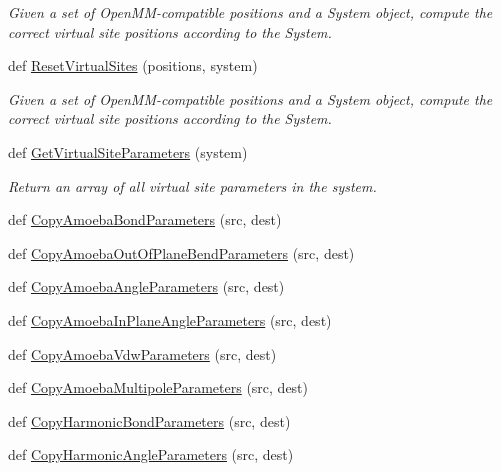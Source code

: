 \begin{DoxyCompactItemize}
\begin{DoxyCompactList}\small\item\em Given a set of Open\+M\+M-\/compatible positions and a System object, compute the correct virtual site positions according to the System. \end{DoxyCompactList}\item 
def \hyperlink{namespacesrc_1_1openmmio_ac0f168dd1caad3c5fe49e598758095c1}{Reset\+Virtual\+Sites} (positions, system)
\begin{DoxyCompactList}\small\item\em Given a set of Open\+M\+M-\/compatible positions and a System object, compute the correct virtual site positions according to the System. \end{DoxyCompactList}\item 
def \hyperlink{namespacesrc_1_1openmmio_a33ffd85523d8820df033185c58938001}{Get\+Virtual\+Site\+Parameters} (system)
\begin{DoxyCompactList}\small\item\em Return an array of all virtual site parameters in the system. \end{DoxyCompactList}\item 
def \hyperlink{namespacesrc_1_1openmmio_ac0fe2d35bcfdc2c94cda354a5bc93a11}{Copy\+Amoeba\+Bond\+Parameters} (src, dest)
\item 
def \hyperlink{namespacesrc_1_1openmmio_a72f8a12fe66bfcf92c034363652249d7}{Copy\+Amoeba\+Out\+Of\+Plane\+Bend\+Parameters} (src, dest)
\item 
def \hyperlink{namespacesrc_1_1openmmio_a9dc2514058421b3874712cfa3a745467}{Copy\+Amoeba\+Angle\+Parameters} (src, dest)
\item 
def \hyperlink{namespacesrc_1_1openmmio_a5c95b3f06588585c9750b3a593c00d35}{Copy\+Amoeba\+In\+Plane\+Angle\+Parameters} (src, dest)
\item 
def \hyperlink{namespacesrc_1_1openmmio_a1c3b100c558ec5e2dfc6b9e576c3e116}{Copy\+Amoeba\+Vdw\+Parameters} (src, dest)
\item 
def \hyperlink{namespacesrc_1_1openmmio_ab727cc0fceb5ed4abacd52acc99ec43a}{Copy\+Amoeba\+Multipole\+Parameters} (src, dest)
\item 
def \hyperlink{namespacesrc_1_1openmmio_aac056cf25d1ae9d169117969690d3be2}{Copy\+Harmonic\+Bond\+Parameters} (src, dest)
\item 
def \hyperlink{namespacesrc_1_1openmmio_aa184460c9c3b9beaa95abaeb8a879bf9}{Copy\+Harmonic\+Angle\+Parameters} (src, dest)
\item 

\end{DoxyCompactItemize}
